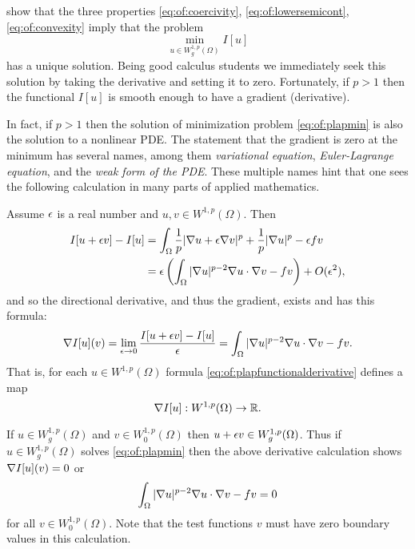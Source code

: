 \citet{KinderlehrerStampacchia1980} show that the three properties \eqref{eq:of:coercivity}, \eqref{eq:of:lowersemicont}, \eqref{eq:of:convexity} imply that the problem
\begin{equation}
\min_{u \in W_g^{1,p}(\Omega)} I[u] \label{eq:of:plapmin}
\end{equation}
has a unique solution.  Being good calculus students we immediately seek this solution by taking the derivative and setting it to zero.  Fortunately, if $p>1$ then the functional $I[u]$ is smooth enough to have a gradient (derivative).

In fact, if $p>1$ then the solution of minimization problem \eqref{eq:of:plapmin} is also the solution to a nonlinear PDE.  The statement that the gradient is zero at the minimum has several names, among them \emph{variational equation}, \emph{Euler-Lagrange equation}, and the \emph{weak form of the PDE}.  These multiple names hint that one sees the following calculation in many parts of applied mathematics.

Assume $\epsilon$ is a real number and $u,v \in W^{1,p}(\Omega)$.  Then
\begin{align*}
I[u+\epsilon v] - I[u] &= \int_\Omega \frac{1}{p} |\nabla u + \epsilon \nabla v|^p + \frac{1}{p} |\nabla u|^p - \epsilon f v \\
   &= \epsilon \left(\int_\Omega |\nabla u|^{p-2} \nabla u \cdot \nabla v - f v\right) + O(\epsilon^2),
\end{align*}
and so the directional derivative, and thus the gradient, exists and has this formula:
\begin{equation}
\nabla I[u](v) = \lim_{\epsilon\to 0} \frac{I[u+\epsilon v] - I[u]}{\epsilon} = \int_\Omega |\nabla u|^{p-2} \nabla u \cdot \nabla v - f v. \label{eq:of:plapfunctionalderivative}
\end{equation}
That is, for each $u \in W^{1,p}(\Omega)$ formula \eqref{eq:of:plapfunctionalderivative} defines a map
   $$\nabla I[u] : W^{1,p}(\Omega) \to \mathbb{R}.$$

If $u \in W_g^{1,p}(\Omega)$ and $v\in W_0^{1,p}(\Omega)$ then $u+\epsilon v\in W_g^{1,p}(\Omega)$.  Thus if $u \in W_g^{1,p}(\Omega)$ solves \eqref{eq:of:plapmin} then the above derivative calculation shows $\nabla I[u](v)=0$ or
\begin{equation}
\int_\Omega |\nabla u|^{p-2} \nabla u \cdot \nabla v - f v = 0 \label{eq:of:plapweakform}
\end{equation}
for all $v\in W_0^{1,p}(\Omega)$.  Note that the test functions $v$ must have zero boundary values in this calculation.

